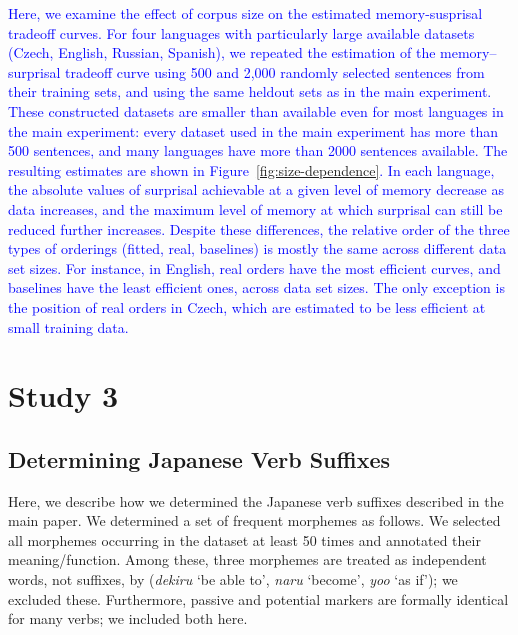 \documentclass[11pt,letterpaper]{article}
\begin{document}
\textcolor{blue}{Here, we examine the effect of corpus size on the estimated memory-susprisal tradeoff curves.
For four languages with particularly large available datasets (Czech, English, Russian, Spanish), we repeated the estimation of the memory--surprisal tradeoff curve using 500 and 2,000 randomly selected sentences from their training sets, and using the same heldout sets as in the main experiment.
These constructed datasets are smaller than available even for most languages in the main experiment: every dataset used in the main experiment has more than 500 sentences, and many languages have more than 2000 sentences available.
The resulting estimates are shown in Figure~\ref{fig:size-dependence}.
In each language, the absolute values of surprisal achievable at a given level of memory decrease as data increases, and the maximum level of memory at which surprisal can still be reduced further increases.
Despite these differences, the relative order of the three types of orderings (fitted, real, baselines) is mostly the same across different data set sizes. For instance, in English, real orders have the most efficient curves, and baselines have the least efficient ones, across data set sizes. The only exception is the position of real orders in Czech, which are estimated to be less efficient at small training data.}

\section{Study 3}

\subsection{Determining Japanese Verb Suffixes}

Here, we describe how we determined the Japanese verb suffixes described in the main paper.
We determined a set of frequent morphemes as follows.
We selected all morphemes occurring in the dataset at least 50 times and annotated their meaning/function.
Among these, three morphemes are treated as independent words, not suffixes, by \cite{kaiser2013japanese} (\textit{dekiru} `be able to', \textit{naru} `become', \textit{yoo} `as if'); we excluded these.
Furthermore, passive and potential markers are formally identical for many verbs; we included both here.
\end{document}
